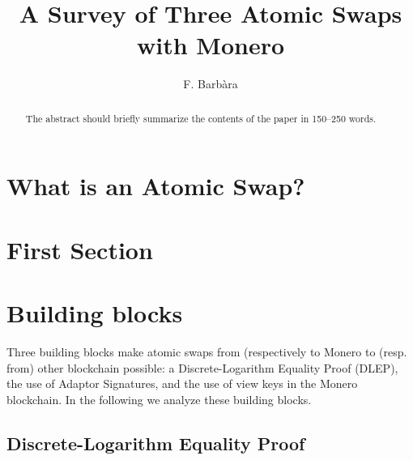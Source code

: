 \documentclass[runningheads]{llncs}
\begin{document}
%
\title{A Survey of Three Atomic Swaps with Monero}
%
%
\author{F. Barb\`ara}
%
%
%
\maketitle              %
%
\begin{abstract}
The abstract should briefly summarize the contents of the paper in
150--250 words.

\end{abstract}
%
%
%
\section{What is an Atomic Swap?}
\section{First Section}
\section{Building blocks}
Three building blocks make atomic swaps from (respectively to Monero to (resp. from) other blockchain possible: a Discrete-Logarithm Equality Proof (DLEP), the use of Adaptor Signatures, and the use of view keys in the Monero blockchain.
In the following we analyze these building blocks.

\subsection{Discrete-Logarithm Equality Proof}\label{sec_dlep}
\end{document}

